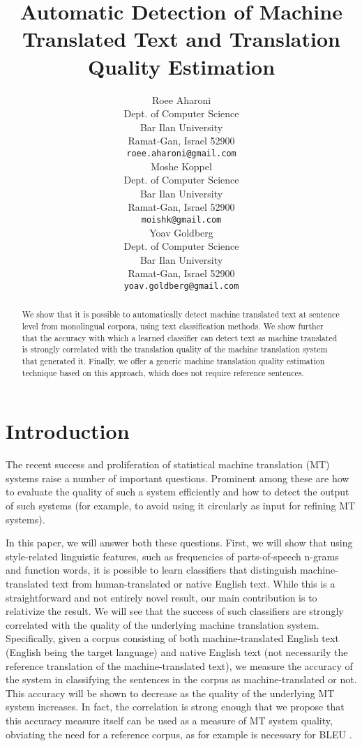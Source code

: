 \documentclass[11pt]{article}
\title{Automatic Detection of Machine Translated Text and Translation Quality Estimation}
\author{Roee Aharoni\\
  Dept. of Computer Science\\
  Bar Ilan University\\
  Ramat-Gan, Israel 52900\\
  {\tt roee.aharoni@gmail.com} \\
\And
  Moshe Koppel\\
  Dept. of Computer Science\\
  Bar Ilan University\\
  Ramat-Gan, Israel 52900\\
  {\tt moishk@gmail.com}\\
\And
  Yoav Goldberg\\
  Dept. of Computer Science\\
  Bar Ilan University\\
  Ramat-Gan, Israel 52900\\
  {\tt yoav.goldberg@gmail.com}\\
}
\date{}
\begin{document}
\maketitle
\begin{abstract}
We show that it is possible to automatically detect 
machine translated text at sentence level from monolingual corpora, 
using text classification methods. We show further that the accuracy with which a 
learned classifier can detect text as machine translated is strongly correlated with 
the translation quality of the machine translation system that generated it. 
Finally, we offer a generic machine translation quality estimation technique based on this approach, 
which does not require reference sentences.
\end{abstract}

\section{Introduction}

The recent success and proliferation of statistical machine translation (MT) systems raise a  number of important questions. Prominent among these are how to evaluate the quality of such a system efficiently and how to detect the output of such systems (for example, to avoid using it circularly as input for refining MT systems). 

In this paper, we will answer both these questions. First, we will show that using style-related linguistic features, such as frequencies of parts-of-speech n-grams and function words, it is possible to learn classifiers that distinguish machine-translated text from human-translated or native English text. While this is a straightforward and not entirely novel result, our main contribution is to relativize the result. We will see that the success of such classifiers are strongly correlated with the quality of the underlying machine translation system. Specifically, given a corpus consisting of both machine-translated English text (English being the target language) and native English text (not necessarily the reference translation of the machine-translated text), we measure the accuracy of the system in classifying the sentences in the corpus as machine-translated or not. This accuracy will be shown to decrease as the quality of the underlying MT system increases. In fact, the correlation is strong enough that we propose that this accuracy measure itself can be used as a measure of MT system quality, obviating the need for a reference corpus, as for example is necessary for BLEU \cite{PapineniEtAl2001}.
\end{document}
